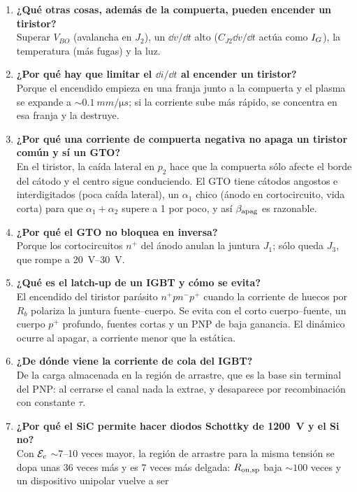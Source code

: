 \begin{enumerate}
  los $\alpha$ altos aunque se retire $\IG$, mientras $\IA>I_H$.
  \item \textbf{¿Qué otras cosas, además de la compuerta, pueden encender un tiristor?}\\
  Superar $V_{BO}$ (avalancha en $J_2$), un $\dd v/\dd t$ alto ($C_{J2}\dd v/\dd t$ actúa como
  $\IG$), la temperatura (más fugas) y la luz.
  \item \textbf{¿Por qué hay que limitar el $\dd i/\dd t$ al encender un tiristor?}\\
  Porque el encendido empieza en una franja junto a la compuerta y el plasma se expande a
  $\sim\SI{0.1}{mm/\micro s}$; si la corriente sube más rápido, se concentra en esa franja y la
  destruye.
  \item \textbf{¿Por qué una corriente de compuerta negativa no apaga un tiristor común y sí un GTO?}\\
  En el tiristor, la caída lateral en $p_2$ hace que la compuerta sólo afecte el borde del cátodo y el
  centro sigue conduciendo. El GTO tiene cátodos angostos e interdigitados (poca caída lateral), un
  $\alpha_1$ chico (ánodo en cortocircuito, vida corta) para que $\alpha_1+\alpha_2$ supere a 1 por poco,
  y así $\beta_{\mathrm{apag}}$ es razonable.
  \item \textbf{¿Por qué el GTO no bloquea en inversa?}\\
  Porque los cortocircuitos $n^+$ del ánodo anulan la juntura $J_1$; sólo queda $J_3$, que rompe a
  \SIrange{20}{30}{V}.
  \item \textbf{¿Qué es el latch-up de un IGBT y cómo se evita?}\\
  El encendido del tiristor parásito $n^+pn^-p^+$ cuando la corriente de huecos por $R_b$ polariza la
  juntura fuente--cuerpo. Se evita con el corto cuerpo--fuente, un cuerpo $p^+$ profundo, fuentes
  cortas y un PNP de baja ganancia. El dinámico ocurre al apagar, a corriente menor que la estática.
  \item \textbf{¿De dónde viene la corriente de cola del IGBT?}\\
  De la carga almacenada en la región de arrastre, que es la base sin terminal del PNP: al cerrarse el
  canal nada la extrae, y desaparece por recombinación con constante $\tau$.
  \item \textbf{¿Por qué el SiC permite hacer diodos Schottky de \SI{1200}{V} y el Si no?}\\
  Con $\mathcal{E}_c$ $\sim7$--10 veces mayor, la región de arrastre para la misma tensión se dopa unas 36 veces
  más y es 7 veces más delgada: $R_{\mathrm{on,sp}}$ baja $\sim100$ veces y un dispositivo unipolar vuelve a ser

\end{enumerate}
